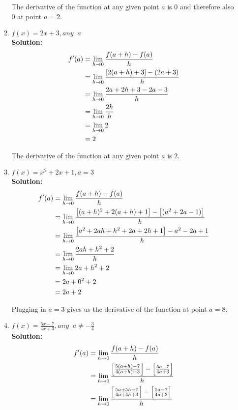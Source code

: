 \documentclass[a4paper]{article}
\begin{document}
\begin{enumerate}
\begin{enumerate}
The derivative of the function at any given point $a$ is $0$ and therefore also 0 at point $a = 2$.\\	
	
	\item $f(x) = 2x + 3, any \; \; a$\\
	\textbf{Solution:}\\
	
\begin{align}
	f'(a) &= \lim_{h \to 0} \frac{f(a + h) - f(a)}{h}\notag\\
	&= \lim_{h \to 0} \frac{\left[ 2(a+h) + 3\right] - (2a + 3)}{h}\notag\\
	&= \lim_{h \to 0} \frac{2a + 2h + 3 - 2a - 3}{h}\notag\\
	&= \lim_{h \to 0} \frac{2h}{h}\notag\\
	&= \lim_{h \to 0} 2\notag\\
	&= 2\notag
\end{align}		
	
The derivative of the function at any given point $a$ is $2$.\\	
	
	
	\item $f(x) = x^2 + 2x + 1, a = 3$\\
	\textbf{Solution:}\\
	
\begin{align}
	f'(a) &= \lim_{h \to 0} \frac{f(a + h) - f(a)}{h}\notag\\
	&= \lim_{h \to 0} \frac{\left[ (a+h)^2 + 2(a+h) + 1\right] - \left[ (a^2 + 2a - 1) \right]}{h}\notag\\
	&= \lim_{h \to 0} \frac{\left[ a^2 + 2ah + h^2 + 2a + 2h + 1\right] - a^2 - 2a + 1}{h}\notag\\
	&= \lim_{h \to 0} \frac{2ah + h^2 + 2}{h}\notag\\
	&= \lim_{h \to 0} 2a + h^2 + 2\notag\\
	&= 2a + 0^2 + 2\notag\\
	&= 2a + 2\notag
\end{align}	
	
Plugging in $a = 3$ gives us the derivative of the function at point $a = 8$.\\
	
	
	\item $f(x) = \frac{5x - 7}{4x + 3}, any \; \; a \neq -\frac{3}{4}$\\
	\textbf{Solution:}\\
	
\begin{align}
	f'(a) &= \lim_{h \to 0} \frac{f(a + h) - f(a)}{h}\notag\\
		&= \lim_{h \to 0} \frac{ \left[ \frac{5(a+h) - 7}{4(a+h) + 3 } \right] - \left[ \frac{5a - 7}{4a + 3} \right]}{h}\notag\\
		&= \lim_{h \to 0} \frac{ \left[ \frac{5a + 5h - 7}{4a + 4h + 3 } \right] - \left[ \frac{5a - 7}{4a + 3} \right]}{h}\notag
		\end{align}		
	

\end{enumerate}
\end{enumerate}
\end{document}
